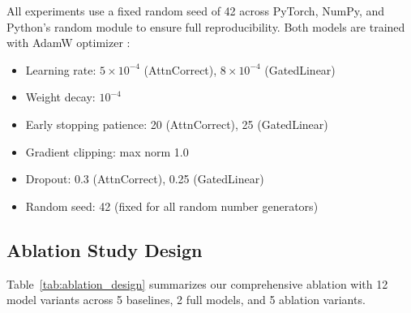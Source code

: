 \documentclass[10pt,conference]{IEEEtran}
\begin{document}
All experiments use a fixed random seed of 42 across PyTorch, NumPy, and Python's random module to ensure full reproducibility. Both models are trained with AdamW optimizer \cite{loshchilov2019decoupled}:
\begin{itemize}
    \item Learning rate: $5 \times 10^{-4}$ (AttnCorrect), $8 \times 10^{-4}$ (GatedLinear)
    \item Weight decay: $10^{-4}$
    \item Early stopping patience: 20 (AttnCorrect), 25 (GatedLinear)
    \item Gradient clipping: max norm 1.0
    \item Dropout: 0.3 (AttnCorrect), 0.25 (GatedLinear)
    \item Random seed: 42 (fixed for all random number generators)
\end{itemize}

\subsection{Ablation Study Design}

Table~\ref{tab:ablation_design} summarizes our comprehensive ablation with 12 model variants across 5 baselines, 2 full models, and 5 ablation variants.
\end{document}
